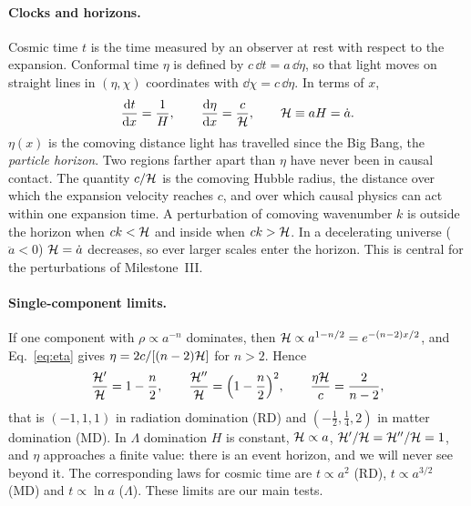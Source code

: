 \paragraph*{Clocks and horizons.} Cosmic time $t$ is the time measured by an observer at rest with respect to the
expansion. Conformal time $\eta$ is defined by $c\,\dd t=a\,\dd\eta$, so that light moves on straight lines in
$(\eta,\chi)$ coordinates with $\dd\chi=c\,\dd\eta$. In terms of $x$,
\begin{equation}
\frac{\mathrm{d} t}{\mathrm{d} x} = \frac{1}{H}, \qquad \frac{\mathrm{d}\eta}{\mathrm{d} x} = \frac{c}{\mathcal{H}},\qquad \mathcal{H}\equiv aH=\dot a.
\label{eq:eta}
\end{equation}
$\eta(x)$ is the comoving distance light has travelled since the Big Bang, the \emph{particle horizon}. Two regions
farther apart than $\eta$ have never been in causal contact. The quantity $c/\mathcal{H}$ is the comoving Hubble radius, the
distance over which the expansion velocity reaches $c$, and over which causal physics can act within one expansion
time. A perturbation of comoving wavenumber $k$ is outside the horizon when $ck<\mathcal{H}$ and inside when $ck>\mathcal{H}$. In a
decelerating universe ($\ddot a<0$) $\mathcal{H}=\dot a$ decreases, so ever larger scales enter the horizon. This is central
for the perturbations of Milestone~III.

\paragraph*{Single-component limits.} If one component with $\rho\propto a^{-n}$ dominates, then
$\mathcal{H}\propto a^{1-n/2}=e^{-(n-2)x/2}$, and Eq.~\eqref{eq:eta} gives $\eta=2c/[(n-2)\mathcal{H}]$ for $n>2$. Hence
\begin{equation}
\frac{\mathcal{H}'}{\mathcal{H}}=1-\frac{n}{2},\qquad \frac{\mathcal{H}''}{\mathcal{H}}=\Big(1-\frac{n}{2}\Big)^2,\qquad \frac{\eta\mathcal{H}}{c}=\frac{2}{n-2},
\label{eq:Hp_limits}
\end{equation}
that is $(-1,1,1)$ in radiation domination (RD) and $(-\tfrac12,\tfrac14,2)$ in matter domination (MD). In $\Lambda$
domination $H$ is constant, $\mathcal{H}\propto a$, $\mathcal{H}'/\mathcal{H}=\mathcal{H}''/\mathcal{H}=1$, and $\eta$ approaches a finite value: there is an
event horizon, and we will never see beyond it. The corresponding laws for cosmic time are $t\propto a^2$ (RD),
$t\propto a^{3/2}$ (MD) and $t\propto\ln a$ ($\Lambda$). These limits are our main tests.

